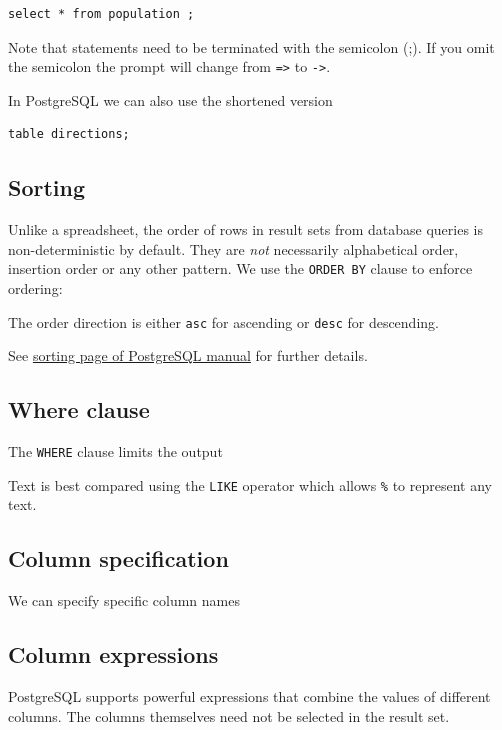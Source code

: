 \documentclass{pgnotes}
\begin{document}
\begin{verbatim}
select * from population ;
\end{verbatim}

Note that statements need to be terminated with the semicolon (;). If
you omit the semicolon the prompt will change from
\texttt{=\textgreater{}} to \texttt{-\textgreater{}}.

In PostgreSQL we can also use the shortened version

\begin{verbatim}
table directions;
\end{verbatim}

\subsection{Sorting}\label{sorting}

Unlike a spreadsheet, the order of rows in result sets from database
queries is non-deterministic by default. They are \emph{not} necessarily
alphabetical order, insertion order or any other pattern. We use the
\texttt{ORDER\ BY} clause to enforce ordering:

The order direction is either \texttt{asc} for ascending or
\texttt{desc} for descending.

See \href{https://www.postgresql.org/docs/13/queries-order.html}{sorting
page of PostgreSQL manual} for further details.

\subsection{Where clause}\label{where-clause}

The \texttt{WHERE} clause limits the output


Text is best compared using the \texttt{LIKE} operator which allows
\texttt{\%} to represent any text.


\subsection{Column specification}\label{column-specification}

We can specify specific column names


\subsection{Column expressions}\label{column-expressions}

PostgreSQL supports powerful expressions that combine the values of
different columns. The columns themselves need not be selected in the
result set.
\end{document}
